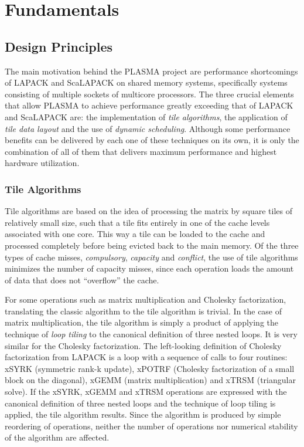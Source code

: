 
\chapter{Fundamentals}


\section{Design Principles}

The main motivation behind the PLASMA project are performance shortcomings of \mbox{LAPACK}
and ScaLAPACK on shared memory systems, specifically systems consisting of multiple sockets
of multicore processors.
The three crucial elements that allow PLASMA to achieve performance greatly exceeding
that of LAPACK and ScaLAPACK are: the implementation of {\em tile algorithms}, the application
of {\em tile data layout} and the use of {\em dynamic scheduling}.
Although some performance benefits can be delivered by each one of these techniques
on its own, it is only the combination of all of them that delivers maximum performance
and highest hardware utilization.


\subsection{Tile Algorithms}

Tile algorithms are based on the idea of processing the matrix by square tiles of relatively
small size, such that a tile fits entirely in one of the cache levels associated with one
core.
This way a tile can be loaded to the cache and processed completely before being evicted back
to the main memory.
Of the three types of cache misses, {\em compulsory}, {\em capacity} and {\em conflict},
the use of tile algorithms minimizes the number of capacity misses, since each operation
loads the amount of data that does not ``overflow'' the cache.

For some operations such as matrix multiplication and Cholesky factorization, translating
the classic algorithm to the tile algorithm is trivial.
In the case of matrix multiplication, the tile algorithm is simply a product of applying the
technique of {\em loop tiling} to the canonical definition of three nested loops.
It is very similar for the Cholesky factorization.
The \mbox{left-looking} definition of Cholesky factorization from LAPACK is a loop with
a sequence of calls to four routines: xSYRK (symmetric \mbox{rank-k} update), xPOTRF
(Cholesky factorization of a small block on the diagonal), xGEMM (matrix multiplication) and
xTRSM (triangular solve).
If the xSYRK, xGEMM and xTRSM operations are expressed with the canonical definition of three
nested loops and the technique of loop tiling is applied, the tile algorithm results.
Since the algorithm is produced by simple reordering of operations, neither the number of
operations nor numerical stability of the algorithm are affected.

